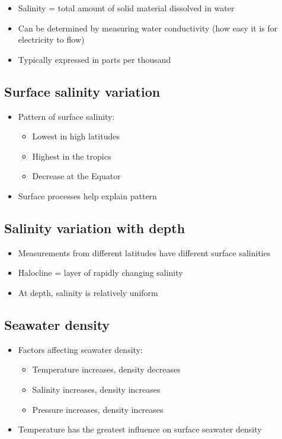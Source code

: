 \begin{itemize}
    \item Salinity = total amount of solid material dissolved in water
    \item Can be determined by measuring water conductivity (how easy
        it is for electricity to flow)
    \item Typically expressed in parts per thousand
\end{itemize}

\subsection{Surface salinity variation}

\begin{itemize}
    \item Pattern of surface salinity:
        \begin{itemize}
            \item Lowest in high latitudes
            \item Highest in the tropics
            \item Decrease at the Equator
        \end{itemize}
    \item Surface processes help explain pattern
\end{itemize}

\subsection{Salinity variation with depth}

\begin{itemize}
    \item Measurements from different latitudes have different surface
        salinities
    \item Halocline = layer of rapidly changing salinity
    \item At depth, salinity is relatively uniform
\end{itemize}

\subsection{Seawater density}

\begin{itemize}
    \item Factors affecting seawater density:
        \begin{itemize}
            \item Temperature increases, density decreases
            \item Salinity increases, density increases
            \item Pressure increases, density increases
        \end{itemize}
    \item Temperature has the greatest influence on surface seawater
        density
\end{itemize}

